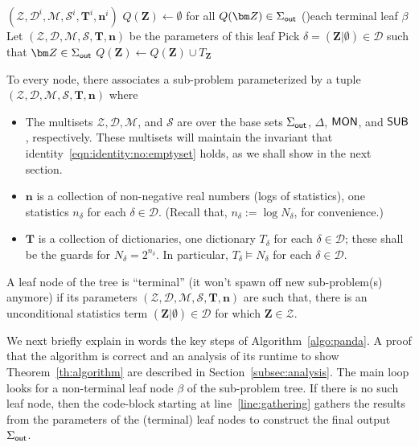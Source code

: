 \documentclass{theoretics}
\newcommand{\calM}{\mathcal M}
\newcommand{\calS}{\mathcal S}
\newcommand{\calD}{\mathcal D}
\newcommand{\calZ}{\mathcal Z}
\newcommand{\out}{\text{\sf out}}
\newcommand{\mon}{\text{\sf MON}}
\newcommand{\sub}{\text{\sf SUB}}
\begin{document}
{\begin{algorithm}
{{{                             $(\calZ, \calD^i, \calM, \calS^i, \bm T^i, \bm n^i)$\;
                   }
              }
            }
            \;
   $Q(\bm Z) \leftarrow \emptyset$ for all $Q(\bm Z) \in \Sigma_{\out}$ \label{line:gathering}\;
          \For(){each terminal leaf $\beta$}{
             Let $(\calZ, \calD, \calM, \calS, \bm T, \bm n)$ be the parameters of this leaf\;
             Pick $\delta = (\bm Z | \emptyset) \in \calD$ such that
                   $\bm Z \in \Sigma_{\out}$ 
             $Q(\bm Z) \leftarrow Q(\bm Z) \cup T_{\bm Z}$ \label{line:got:it}\;
                 }
\end{algorithm}
}

To every node, there associates a sub-problem parameterized by
a tuple $(\calZ, \calD, \calM, \calS, \bm T, \bm n)$ where
\begin{itemize}
  \item The multisets $\calZ, \calD, \calM$, and $\calS$ are over the
  base sets $\Sigma_{\out}$, $\Delta$, $\mon$, and $\sub$, respectively.
  These multisets will maintain the invariant that identity~\eqref{eqn:identity:no:emptyset} holds,
  as we shall show in the next section.
  \item $\bm n$ is a collection of non-negative real numbers (logs of statistics), one
  statistics $n_\delta$ for each $\delta \in \calD$.
  (Recall that, $n_\delta := \log N_\delta$, for convenience.)
  \item $\bm T$ is a collection of dictionaries, one
  dictionary $T_\delta$ for each $\delta \in \calD$; these shall be the guards
  for $N_\delta = 2^{n_\delta}$. In particular, $T_\delta\models N_\delta$ for each $\delta \in \calD$.
\end{itemize}

\begin{definition}
    \label{defn:terminal:leaf}
A leaf node of the tree is ``terminal'' (it won't spawn off new sub-problem(s) anymore)
if its parameters
$(\calZ, \calD, \calM, \calS, \bm T, \bm n)$ are such that, there is an unconditional
statistics term $(\bm Z | \emptyset) \in \calD$ for which $\bm Z \in \calZ$.
\end{definition}

We next briefly explain in words the key steps of Algorithm~\ref{algo:panda}. A proof that
the algorithm is correct and an analysis of its runtime to show Theorem~\ref{th:algorithm}
are described in Section~\ref{subsec:analysis}.
%
The main loop looks for a non-terminal leaf node $\beta$ of the sub-problem tree. If there
is no such leaf node, then the code-block starting at line~\ref{line:gathering} gathers
the results from the parameters of the (terminal) leaf nodes to construct the final output
$\Sigma_\out$.
\end{document}
